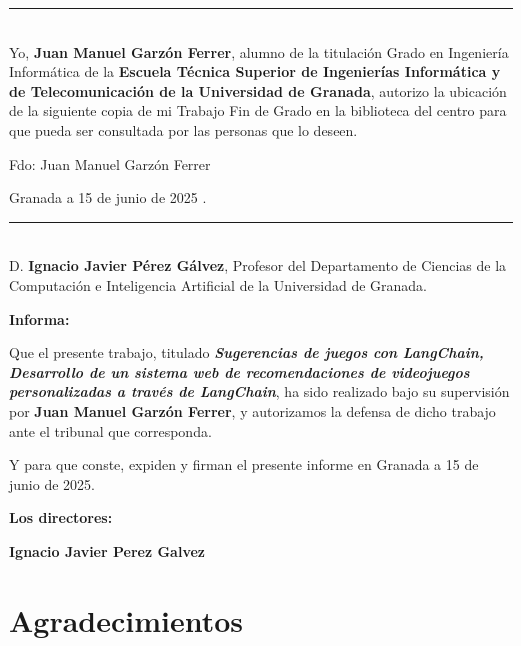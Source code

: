 \newpage


\noindent\rule[-1ex]{\textwidth}{2pt}\\[4.5ex]

Yo, \textbf{Juan Manuel Garzón Ferrer}, alumno de la titulación Grado en Ingeniería Informática de la \textbf{Escuela Técnica Superior
de Ingenierías Informática y de Telecomunicación de la Universidad de Granada}, autorizo la
ubicación de la siguiente copia de mi Trabajo Fin de Grado en la biblioteca del centro para que pueda ser
consultada por las personas que lo deseen.

\vspace{6cm}

\noindent Fdo: Juan Manuel Garzón Ferrer

\vspace{2cm}

\begin{flushright}
Granada a 15 de junio de 2025 .
\end{flushright}


\newpage

\noindent\rule[-1ex]{\textwidth}{2pt}\\[4.5ex]

D. \textbf{Ignacio Javier Pérez Gálvez}, Profesor del Departamento de Ciencias de la Computación e Inteligencia Artificial de la Universidad de Granada.



\textbf{Informa:}


Que el presente trabajo, titulado \textit{\textbf{Sugerencias de juegos con LangChain, Desarrollo de un sistema web de recomendaciones de videojuegos personalizadas a través de LangChain}}, ha sido realizado bajo su supervisión por \textbf{Juan Manuel Garzón Ferrer}, y autorizamos la defensa de dicho trabajo ante el tribunal que corresponda.

\vspace{0.5cm}

Y para que conste, expiden y firman el presente informe en Granada a 15 de junio de 2025.

\vspace{1cm}

\textbf{Los directores:}

\vspace{1cm}

\noindent \textbf{Ignacio Javier Perez Galvez}

\chapter*{Agradecimientos}

